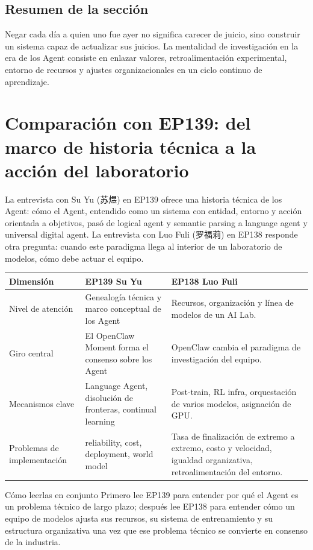 \documentclass[a4paper]{article}
\begin{document}
\subsection{Resumen de la sección}

Negar cada día a quien uno fue ayer no significa carecer de juicio, sino construir un sistema capaz de actualizar sus juicios. La mentalidad de investigación en la era de los Agent consiste en enlazar valores, retroalimentación experimental, entorno de recursos y ajustes organizacionales en un ciclo continuo de aprendizaje.
\section{Comparación con EP139: del marco de historia técnica a la acción del laboratorio}

La entrevista con Su Yu (苏煜) en EP139 ofrece una historia técnica de los Agent: cómo el Agent, entendido como un sistema con entidad, entorno y acción orientada a objetivos, pasó de logical agent y semantic parsing a language agent y universal digital agent. La entrevista con Luo Fuli (罗福莉) en EP138 responde otra pregunta: cuando este paradigma llega al interior de un laboratorio de modelos, cómo debe actuar el equipo.

\noindent\begin{tabularx}{\textwidth}{p{}p{}X}
\toprule
Dimensión & EP139 Su Yu & EP138 Luo Fuli \\
\midrule
Nivel de atención & Genealogía técnica y marco conceptual de los Agent & Recursos, organización y línea de modelos de un AI Lab. \\
Giro central & El OpenClaw Moment forma el consenso sobre los Agent & OpenClaw cambia el paradigma de investigación del equipo. \\
Mecanismos clave & Language Agent, disolución de fronteras, continual learning & Post-train, RL infra, orquestación de varios modelos, asignación de GPU. \\
Problemas de implementación & reliability, cost, deployment, world model & Tasa de finalización de extremo a extremo, costo y velocidad, igualdad organizativa, retroalimentación del entorno. \\
\bottomrule
\end{tabularx}

\begin{knowledgebox}{Cómo leerlas en conjunto}
Primero lee EP139 para entender por qué el Agent es un problema técnico de largo plazo; después lee EP138 para entender cómo un equipo de modelos ajusta sus recursos, su sistema de entrenamiento y su estructura organizativa una vez que ese problema técnico se convierte en consenso de la industria.
\end{knowledgebox}
\end{document}
